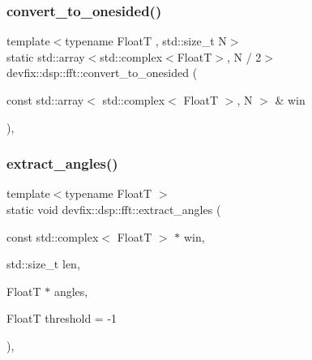 \mbox{\label{structdevfix_1_1dsp_1_1fft_a7529cbbcd074fe451c13791acfb77fb0}} 
\subsubsection{\texorpdfstring{convert\+\_\+to\+\_\+onesided()}{convert\_to\_onesided()}\hspace{0.1cm}{\footnotesize\ttfamily [3/3]}}
{\footnotesize\ttfamily template$<$typename FloatT , std\+::size\+\_\+t N$>$ \\
static std\+::array$<$std\+::complex$<$FloatT$>$, N / 2$>$ devfix\+::dsp\+::fft\+::convert\+\_\+to\+\_\+onesided (\begin{DoxyParamCaption}\item[{const std\+::array$<$ std\+::complex$<$ FloatT $>$, N $>$ \&}]{win }\end{DoxyParamCaption})\hspace{0.3cm}{\ttfamily [inline]}, {\ttfamily [static]}}

\mbox{\label{structdevfix_1_1dsp_1_1fft_ac2be4d53cf6ae645c4be7b773f55e3ca}} 
\subsubsection{\texorpdfstring{extract\+\_\+angles()}{extract\_angles()}\hspace{0.1cm}{\footnotesize\ttfamily [1/3]}}
{\footnotesize\ttfamily template$<$typename FloatT $>$ \\
static void devfix\+::dsp\+::fft\+::extract\+\_\+angles (\begin{DoxyParamCaption}\item[{const std\+::complex$<$ FloatT $>$ $\ast$}]{win,  }\item[{std\+::size\+\_\+t}]{len,  }\item[{FloatT $\ast$}]{angles,  }\item[{FloatT}]{threshold = {\ttfamily -\/1} }\end{DoxyParamCaption})\hspace{0.3cm}{\ttfamily [inline]}, {\ttfamily [static]}}



